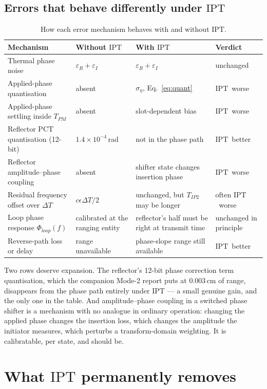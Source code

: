 \documentclass[11pt,a4paper]{article}
\newcommand{\PCT}{\ensuremath{\mathrm{PCT}}}
\newcommand{\IPT}{\ensuremath{\mathrm{IPT}}}
\newcommand{\Tpm}{T_{PM}}
\newcommand{\Tiptwo}{T_{IP2}}
\begin{document}
\subsection{Errors that behave differently under \IPT}

\begin{table}[h]
\caption{How each error mechanism behaves with and without \IPT.}
\label{tab:errcompare}
\centering\small
\begin{tabular}{@{}L{34mm}L{40mm}L{40mm}L{16mm}@{}}
\toprule
Mechanism & Without \IPT & With \IPT & Verdict \\
\midrule
Thermal phase noise & $\varepsilon_R+\varepsilon_I$ & $\varepsilon_R+\varepsilon_I$ & unchanged \\
Applied-phase quantisation & absent & $\sigma_\eta$, Eq.~\eqref{eq:quant} & \IPT\ worse \\
Applied-phase settling inside $\Tpm$ & absent & slot-dependent bias & \IPT\ worse \\
Reflector $\PCT$ quantisation (12-bit) & $1.4\times10^{-4}$\,rad & not in the phase path & \IPT\ better \\
Reflector amplitude--phase coupling & absent & shifter state changes insertion phase & \IPT\ worse \\
Residual frequency offset over $\Delta T$ & $c\epsilon\Delta T/2$ & unchanged, but $\Tiptwo$ may be longer & often \IPT\ worse \\
Loop phase response $\Phi_{loop}(f)$ & calibrated at the ranging entity & reflector's half must be right at transmit time & unchanged in principle \\
Reverse-path loss or delay & range unavailable & phase-slope range still available & \IPT\ better \\
\bottomrule
\end{tabular}
\end{table}

Two rows deserve expansion. The reflector's 12-bit phase correction term quantisation, which the
companion Mode-2 report puts at $0.003$\,cm of range, disappears from the phase path entirely under
\IPT{} --- a small genuine gain, and the only one in the table. And amplitude--phase coupling in a
switched phase shifter is a mechanism with no analogue in ordinary operation: changing the applied
phase changes the insertion loss, which changes the amplitude the initiator measures, which
perturbs a transform-domain weighting. It is calibratable, per state, and should be.
\section{What \IPT{} permanently removes}
\label{sec:lost}
\end{document}
